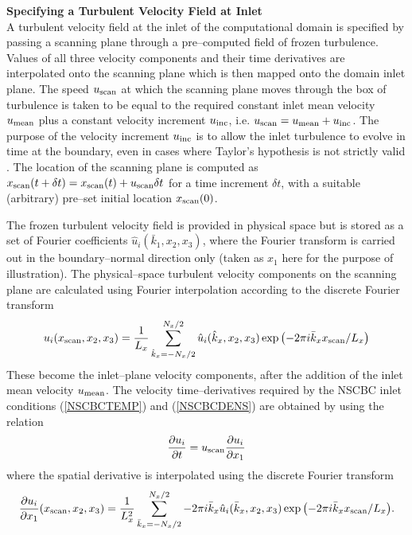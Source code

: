 \documentclass[dvips]{article}
\begin{document}
\vspace{2mm}
\noindent
{\bf Specifying a Turbulent Velocity Field at Inlet}\\
A turbulent velocity field at the inlet of the computational domain is
specified by passing a scanning plane through a pre--computed field of
frozen turbulence.  Values of all three velocity components and their
time derivatives are interpolated onto the scanning plane which is then
mapped onto the domain inlet plane.  The speed $u_{\rm scan}$ at which the
scanning plane moves through the box of turbulence is taken to be equal
to the required constant inlet mean velocity $u_{\rm mean}$ plus a constant
velocity increment $u_{\rm inc}$, i.e. $u_{\rm scan} = u_{\rm mean}
+ u_{\rm inc}$. The purpose of the velocity increment $u_{\rm inc}$ is to
allow the inlet turbulence to evolve in time at the boundary, even in
cases where Taylor's hypothesis is not strictly valid \cite{Wille}.
The location of the scanning plane is computed as
$x_{\rm scan}(t+\delta t) = x_{\rm scan}(t) + u_{\rm scan}\delta t$ for a
time increment $\delta t$, with a suitable (arbitrary) pre--set initial
location $x_{\rm scan}(0)$.

The frozen turbulent velocity field is provided in physical space but is
stored as a set of Fourier coefficients $\hat{u}_{i}(\bar{k}_{1},x_{2},x_{3})$,
where the Fourier transform is carried out in the boundary--normal direction
only (taken as $x_{1}$ here for the purpose of illustration).  The
physical--space turbulent velocity components on the scanning plane are
calculated using Fourier interpolation according to the discrete Fourier
transform
\begin{equation}
u_{i}(x_{\rm scan},x_{2},x_{3}) =
\frac{1}{L_{x}}\sum_{\hat{k}_{x}=-N_{x}/2}^{N_{x}/2}
\hat{u}_{i}(\hat{k}_{x},x_{2},x_{3})
\exp{\left(-2\pi i \bar{k}_{x}x_{\rm scan}/L_{x} \right)}
\end{equation}
These become the inlet--plane velocity components, after the addition of
the inlet mean velocity $u_{\rm mean}$.  The velocity time--derivatives
required by the NSCBC inlet conditions (\ref{NSCBCTEMP}) and
(\ref{NSCBCDENS}) are obtained by using the relation
\begin{equation}
\frac{\partial u_{i}}{\partial t} =
u_{\rm scan}\frac{\partial u_{i}}{\partial x_{1}} 
\end{equation} 
where the spatial derivative is interpolated using the discrete Fourier
transform 
\begin{equation}
\frac{\partial u_{i}}{\partial x_{1}}(x_{\rm scan},x_{2},x_{3}) =
\frac{1}{L_{x}^{2}}\sum_{\bar{k}_{x}=-N_{x}/2}^{N_{x}/2}
-2\pi i \bar{k}_{x} \hat{u}_{i}(\bar{k}_{x},x_{2},x_{3})
\exp{\left(-2\pi i \bar{k}_{x}x_{\rm scan}/L_{x} \right)}.
\end{equation}
\end{document}
